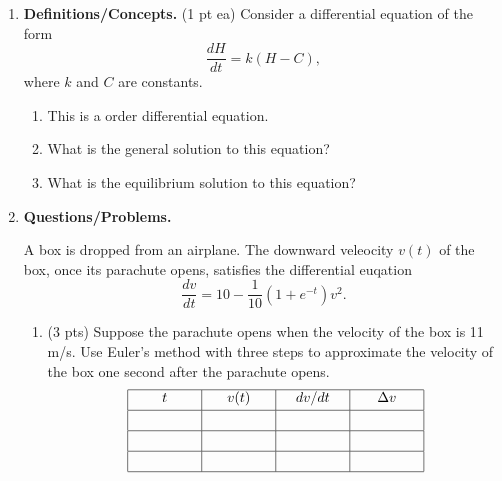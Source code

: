 \documentclass[11pt,letterpaper]{article}
\begin{document}
\begin{enumerate}
\item  \textbf{Definitions/Concepts.} (1 pt ea) Consider a differential equation of the form
\[\frac{dH}{dt}=k(H-C),\]
where $k$ and $C$ are constants.
\begin{enumerate}
\item This is a \underline{\hspace{10ex}} order differential equation.

\vspace{1pc}
\item What is the general solution to this equation?

\vspace{10pc}
\item What is the equilibrium solution to this equation?

\vspace{4pc}
\end{enumerate}
 
\item \textbf{Questions/Problems.} 

A box is dropped from an airplane.  The downward veleocity $v(t)$ of the box, once its parachute opens, satisfies the differential euqation
\[\frac{dv}{dt}=10-\frac{1}{10}(1+e^{-t})v^2.\]
\begin{enumerate}
\item (3 pts)
Suppose the parachute opens when the velocity of the box is 11 m/s.  Use Euler's method with three steps to approximate the velocity of the box one second after the parachute opens.
\[\begin{array}{|c|c|c|c|}
\hline
t & v(t) & dv/dt & \Delta v \\ [0.5ex]
\hline 
\hspace{10ex} & \hspace{10ex} & \hspace{10ex} & \hspace{10ex} \\ [0.5ex]
\hline
\hspace{10ex} & \hspace{10ex} & \hspace{10ex} & \hspace{10ex} \\ [0.5ex]
\hline 
\hspace{10ex} & \hspace{10ex} & \hspace{10ex} & \hspace{10ex} \\ [0.5ex]
\hline
\end{array}\]


\end{enumerate}
\end{enumerate}
\end{document}
